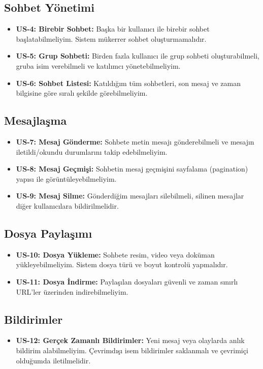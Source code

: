 \subsection{Sohbet Yönetimi}
\begin{itemize}
    \item \textbf{US-4: Birebir Sohbet:} Başka bir kullanıcı ile birebir sohbet başlatabilmeliyim. Sistem mükerrer sohbet oluşturmamalıdır.
    \item \textbf{US-5: Grup Sohbeti:} Birden fazla kullanıcı ile grup sohbeti oluşturabilmeli, gruba isim verebilmeli ve katılımcı yönetebilmeliyim.
    \item \textbf{US-6: Sohbet Listesi:} Katıldığım tüm sohbetleri, son mesaj ve zaman bilgisine göre sıralı şekilde görebilmeliyim.
\end{itemize}

\subsection{Mesajlaşma}
\begin{itemize}
    \item \textbf{US-7: Mesaj Gönderme:} Sohbete metin mesajı gönderebilmeli ve mesajın iletildi/okundu durumlarını takip edebilmeliyim.
    \item \textbf{US-8: Mesaj Geçmişi:} Sohbetin mesaj geçmişini sayfalama (pagination) yapısı ile görüntüleyebilmeliyim.
    \item \textbf{US-9: Mesaj Silme:} Gönderdiğim mesajları silebilmeli, silinen mesajlar diğer kullanıcılara bildirilmelidir.
\end{itemize}

\subsection{Dosya Paylaşımı}
\begin{itemize}
    \item \textbf{US-10: Dosya Yükleme:} Sohbete resim, video veya doküman yükleyebilmeliyim. Sistem dosya türü ve boyut kontrolü yapmalıdır.
    \item \textbf{US-11: Dosya İndirme:} Paylaşılan dosyaları güvenli ve zaman sınırlı URL'ler üzerinden indirebilmeliyim.
\end{itemize}

\subsection{Bildirimler}
\begin{itemize}
    \item \textbf{US-12: Gerçek Zamanlı Bildirimler:} Yeni mesaj veya olaylarda anlık bildirim alabilmeliyim. Çevrimdışı isem bildirimler saklanmalı ve çevrimiçi olduğumda iletilmelidir.
\end{itemize}

